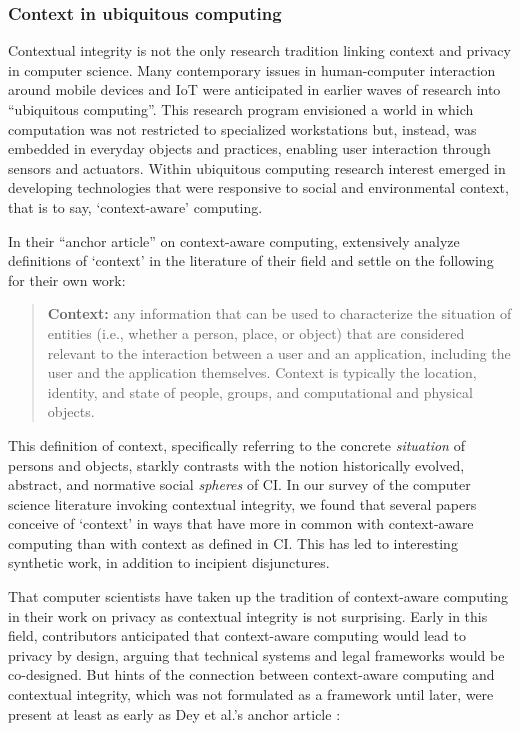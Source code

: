 \documentclass[../thesis.tex]{subfiles}
\begin{document}
\subsubsection{Context in ubiquitous computing}
\label{CI2.2.1}

Contextual integrity is not the only research tradition linking context
and privacy in computer science. Many contemporary issues in
human-computer interaction around mobile devices and IoT were
anticipated in earlier waves of research into
``ubiquitous computing''. This
research program envisioned a world in which computation was not
restricted to specialized workstations but, instead, was embedded in
everyday objects and practices, enabling user interaction through
sensors and actuators. Within ubiquitous computing research interest
emerged in developing technologies that were responsive to social and
environmental context, that is to say,
`context-aware' computing.

In their ``anchor article'' on
context-aware computing, \citet{dey2001conceptual}
extensively analyze
definitions of `context' in the
literature of their field and settle on the following for their own
work:

\begin{quote}
\textbf{Context:}
any information that can be used to characterize the situation of
entities (i.e., whether a person, place, or object) that are considered
relevant to the interaction between a user and an application,
including the user and the application themselves. Context is typically
the location, identity, and state of people, groups, and computational
and physical objects. \citep{dey2001conceptual}
\end{quote}

This definition of context, specifically referring to the concrete
\textit{situation} of persons and objects, starkly contrasts with the
notion historically evolved, abstract, and normative social
\textit{spheres} of CI. In our survey of the computer science
literature invoking contextual integrity, we found that several papers
conceive of `context' in ways that have
more in common with context-aware computing than with context as
defined in CI. This has led to interesting synthetic work, in addition
to incipient disjunctures. 

That computer scientists have taken up the tradition of context-aware
computing in their work on privacy as contextual integrity is not
surprising. Early in this field, contributors
\citet{ackerman2001privacy}
anticipated that
context-aware
computing would lead to privacy by design, arguing that technical
systems and legal frameworks would be co-designed. But hints of the
connection between context-aware computing and contextual integrity,
which was not formulated as a framework until later, were present at
least as early as Dey et al.'s anchor article \cite{dey2001conceptual}:
\end{document}
